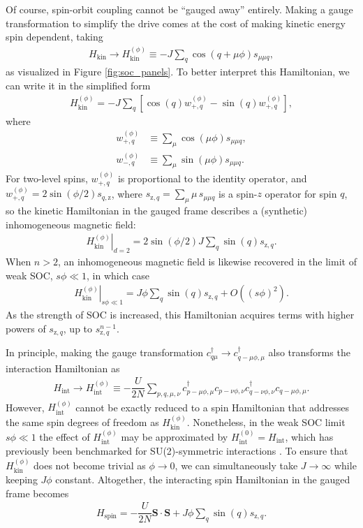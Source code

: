 \documentclass[nofootinbib,twocolumn]{revtex4-2}
\renewcommand{\t}{\text} %
\newcommand{\f}[2]{\dfrac{#1}{#2}} %
\newcommand{\p}[1]{\left(#1\right)} %
\renewcommand{\sp}[1]{\left[#1\right]} %
\renewcommand{\v}{\bm} %
\renewcommand{\c}{\cdot} %
\newcommand{\1}{\mathds{1}}
\newcommand{\z}{\text{z}}
\begin{document}
Of course, spin-orbit coupling cannot be ``gauged away'' entirely.
Making a gauge transformation to simplify the drive comes at the cost of making kinetic energy spin dependent, taking
\begin{align}
  H_{\t{kin}} \to H_{\t{kin}}^{(\phi)}
  \equiv -J \sum_q \cos\p{q+\mu\phi} s_{\mu\mu q},
\end{align}
as visualized in Figure \ref{fig:soc_panels}.
To better interpret this Hamiltonian, we can write it in the simplified form
\begin{align}
  H_{\t{kin}}^{(\phi)}
  = -J \sum_q
  \sp{\cos\p{q} w_{+,q}^{(\phi)} - \sin\p{q} w_{+,q}^{(\phi)}},
\end{align}
where
\begin{align}
  w_{+,q}^{(\phi)} &\equiv \sum_\mu \cos\p{\mu\phi} s_{\mu\mu q}, \\
  w_{-,q}^{(\phi)} &\equiv \sum_\mu \sin\p{\mu\phi} s_{\mu\mu q}.
\end{align}
For two-level spins, $w_{+,q}^{(\phi)}$ is proportional to the identity operator, and $w_{+,q}^{(\phi)}=2\sin\p{\phi/2} s_{q,\z}$, where $s_{\z,q}=\sum_\mu \mu\, s_{\mu\mu q}$ is a spin-$z$ operator for spin $q$, so the kinetic Hamiltonian in the gauged frame describes a (synthetic) inhomogeneous magnetic field:
\begin{align}
  \left. H_{\t{kin}}^{(\phi)} \right|_{d=2}
  = 2\sin\p{\phi/2} J \sum_q \sin\p{q} s_{\z,q}.
\end{align}
When $n>2$, an inhomogeneous magnetic field is likewise recovered in the limit of weak SOC, $s\phi\ll1$, in which case
\begin{align}
  \left. H_{\t{kin}}^{(\phi)} \right|_{s\phi\ll1}
  = J\phi \sum_q \sin\p{q} s_{\z,q} + O\p{(s\phi)^2}.
\end{align}
As the strength of SOC is increased, this Hamiltonian acquires terms with higher powers of $s_{\z,q}$, up to $s_{\z,q}^{n-1}$.

In principle, making the gauge transformation $c_{q\mu}^\dag\to c_{q-\mu\phi,\mu}^\dag$ also transforms the interaction Hamiltonian as
\begin{align}
  H_{\t{int}} \to H_{\t{int}}^{(\phi)}
  \equiv -\f{U}{2N} \sum_{p,q,\mu,\nu}
  c_{p-\mu\phi,\mu}^\dag c_{p-\nu\phi,\nu}
  c_{q-\nu\phi,\nu}^\dag c_{q-\mu\phi,\mu}.
\end{align}
However, $H_{\t{int}}^{(\phi)}$ cannot be exactly reduced to a spin Hamiltonian that addresses the same spin degrees of freedom as $H_{\t{kin}}^{(\phi)}$.
Nonetheless, in the weak SOC limit $s\phi\ll1$ the effect of $H_{\t{int}}^{(\phi)}$ may be approximated by $H_{\t{int}}^{(0)}=H_{\t{int}}$, which has previously been benchmarked for SU(2)-symmetric interactions \cite{he2019engineering, smale2019observation}.
To ensure that $H_{\t{kin}}^{(\phi)}$ does not become trivial as $\phi\to0$, we can simultaneously take $J\to\infty$ while keeping $J\phi$ constant.
Altogether, the interacting spin Hamiltonian in the gauged frame becomes
\begin{align}
  H_{\t{spin}} = -\f{U}{2N} \v S\c\v S + J\phi \sum_q \sin\p{q} s_{\z,q}.
  \label{eq:H_spin}
\end{align}
\end{document}

